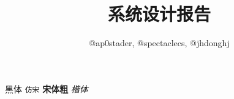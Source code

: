 \documentclass{article}
\title{系统设计报告}
\author{@ap0stader, @spectaclecs, @jhdonghj}
\date{\DTMnow}
\begin{document}
    \maketitle
    
    \textsf{黑体}   %
    \texttt{仿宋}   %
    \textbf{宋体粗} %
    \textit{楷体}   %

    
    
    
\end{document}
